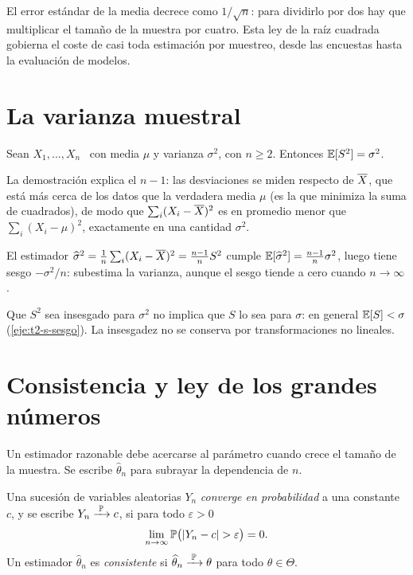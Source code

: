 El error estándar de la media decrece como $1/\sqrt n$: para dividirlo por dos hay que multiplicar el tamaño de la muestra por cuatro. Esta ley de la raíz cuadrada gobierna el coste de casi toda estimación por muestreo, desde las encuestas hasta la evaluación de modelos.

\addtocounter{definicion}{1}%

\section{La varianza muestral}

\begin{teorema}\label{teo:t2-s2}
Sean $X_1,\dots,X_n$ \iid\ con media $\mu$ y varianza $\sigma^{2}$, con $n\ge2$. Entonces $\mathbb{E}[S^{2}]=\sigma^{2}$.
\end{teorema}

La demostración explica el $n-1$: las desviaciones se miden respecto de $\overline{X}$, que está más cerca de los datos que la verdadera media $\mu$ (es la que minimiza la suma de cuadrados), de modo que $\sum_i(X_i-\overline{X})^{2}$ es en promedio menor que $\sum_i(X_i-\mu)^{2}$, exactamente en una cantidad $\sigma^{2}$.

\begin{corolario}\label{cor:t2-sesgo}
El estimador $\widehat\sigma^{2}=\frac1n\sum_i(X_i-\overline{X})^{2}=\frac{n-1}{n}S^{2}$ cumple $\mathbb{E}[\widehat\sigma^{2}]=\frac{n-1}{n}\sigma^{2}$, luego tiene sesgo $-\sigma^{2}/n$: subestima la varianza, aunque el sesgo tiende a cero cuando $n\to\infty$.
\end{corolario}

\begin{observacion}
Que $S^{2}$ sea insesgado para $\sigma^{2}$ no implica que $S$ lo sea para $\sigma$: en general $\mathbb{E}[S]<\sigma$ (\cref{eje:t2-s-sesgo}). La insesgadez no se conserva por transformaciones no lineales.
\end{observacion}

\section{Consistencia y ley de los grandes números}

Un estimador razonable debe acercarse al parámetro cuando crece el tamaño de la muestra. Se escribe $\widehat\theta_n$ para subrayar la dependencia de $n$.

\begin{definicion}[Consistencia]\label{def:t2-consistencia}
Una sucesión de variables aleatorias $Y_n$ \emph{converge en probabilidad} a una constante $c$, y se escribe $Y_n\xrightarrow{\;\mathbb{P}\;} c$, si para todo $\varepsilon>0$
\[
\lim_{n\to\infty}\mathbb{P}\bigl(\lvert Y_n-c\rvert>\varepsilon\bigr)=0.
\]
Un estimador $\widehat\theta_n$ es \emph{consistente} si $\widehat\theta_n\xrightarrow{\;\mathbb{P}\;}\theta$ para todo $\theta\in\Theta$.
\end{definicion}


